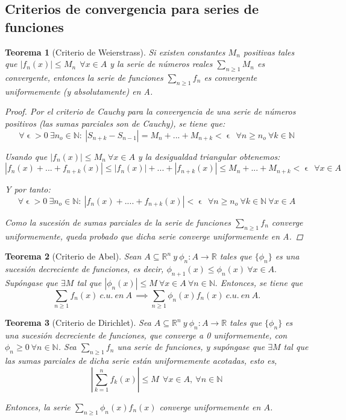 \documentclass[11pt, a4paper]{article}
\let\epsilon\upvarepsilon
\theoremstyle{theorem-style}
\newtheorem{nth}{Teorema}[section]
\theoremstyle{definition-style}
\theoremstyle{remark-style}
\theoremstyle{example-style}
\begin{document}
\subsection{Criterios de convergencia para series de funciones}

\begin{nth}[Criterio de Weierstrass]
	Si existen constantes $ M_{n} $ positivas tales que $ |f_{n}(x)| \leq M_{n}\ \ \forall x \in A$ y la serie de números reales $ \sum_{n \ge 1}M_{n} $ es convergente, entonces la serie de funciones $ \sum_{n \ge 1}f_{n} $ es convergente uniformemente (y absolutamente) en A.
	
\begin{proof}
	Por el criterio de Cauchy para la convergencia de una serie de números positivos (las sumas parciales son de Cauchy), se tiene que:
	$$ \forall \epsilon > 0\ \exists n_{o} \in \mathbb{N}:\ |S_{n+k} - S_{n-1}| = M_{n} + ... + M_{n+k} < \epsilon\ \  \forall n \geq n_{o}\ \forall k \in \mathbb{N} $$
	
	Usando que $ |f_{n}(x)| \leq M_{n}\ \forall x \in A $ y la desigualdad triangular obtenemos:
	$$ |f_{n}(x) + ... + f_{n+k}(x)| \leq |f_{n}(x)| + ... + |f_{n+k}(x)| \leq M_{n} + ... + M_{n+k} < \epsilon\ \ \forall x \in A $$
	
	Y por tanto:
	$$\forall \epsilon > 0\ \exists n_{o} \in \mathbb{N}:\ |f_{n}(x) + .... + f_{n+k}(x)| < \epsilon\ \  \forall n \geq n_{o}\ \forall k \in \mathbb{N}\ \forall x \in A $$
	
	Como la sucesión de sumas parciales de la serie de funciones $\sum_{n\ge 1} f_n$ converge uniformemente, queda probado que dicha serie converge uniformemente en A.
\end{proof}
\end{nth}

\begin{nth}[Criterio de Abel] Sean $ A \subseteq \mathbb{R}^n\  y \ \phi_n : A \rightarrow \mathbb{R}$ tales que $\{\phi_n\}$ es una sucesión decreciente de funciones, es decir, $\phi_{n+1}(x) \leq \phi_n (x)\ \forall x \in A.$ Supóngase que $\exists M$ tal que $|\phi_n (x)| \leq M\ \forall x \in A\ \forall n \in \mathbb{N}.$ Entonces, se tiene que
$$\sum_{n \ge 1} f_n(x)\ c. u.\ en\ A\, \implies \sum_{n \ge 1} \phi_n(x) f_n(x)\ c. u.\ en\ A.$$
\end{nth}

\begin{nth}[Criterio de Dirichlet] Sea $A \subseteq \mathbb{R}^n\  y \ \phi_n : A \rightarrow \mathbb{R}$ tales que $\{\phi_n\}$ es una sucesión decreciente de funciones, que converge a 0 uniformemente, con $\phi_n \ge 0 \ \forall n \in \mathbb{N}$. Sea $\sum_{n \ge 1} f_n$ una serie de funciones, y supóngase que $\exists M$ tal que las sumas parciales de dicha serie están uniformemente acotadas, esto es, $$\left| \sum_{k=1}^n f_k(x) \right| \le M \ \ \forall x \in A, \ \forall n \in \mathbb{N}$$ 

Entonces, la serie $\displaystyle \sum_{n\ge 1} \phi_n(x)f_n(x)$ converge uniformemente en $A$.
	
\end{nth}
\end{document}
